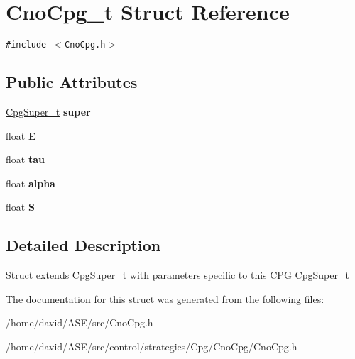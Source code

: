 \hypertarget{structCnoCpg__t}{
\section{CnoCpg\_\-t Struct Reference}
\label{structCnoCpg__t}
}
{\tt \#include $<$CnoCpg.h$>$}

\subsection*{Public Attributes}
\begin{CompactItemize}
\item 
\hypertarget{structCnoCpg__t_63a06575d9d87f4df750ba664cebd9e6}{
\hyperlink{structCpgSuper__t}{CpgSuper\_\-t} \textbf{super}}
\label{structCnoCpg__t_63a06575d9d87f4df750ba664cebd9e6}

\item 
\hypertarget{structCnoCpg__t_bf4e0776f09b677fb325a38092357fe0}{
float \textbf{E}}
\label{structCnoCpg__t_bf4e0776f09b677fb325a38092357fe0}

\item 
\hypertarget{structCnoCpg__t_097cafd33f3ef4612957cde820333731}{
float \textbf{tau}}
\label{structCnoCpg__t_097cafd33f3ef4612957cde820333731}

\item 
\hypertarget{structCnoCpg__t_c3e4ce0d31e2a7abf71f7092582110a8}{
float \textbf{alpha}}
\label{structCnoCpg__t_c3e4ce0d31e2a7abf71f7092582110a8}

\item 
\hypertarget{structCnoCpg__t_cbdeb5591b38c7fa2eed05039dcf4210}{
float \textbf{S}}
\label{structCnoCpg__t_cbdeb5591b38c7fa2eed05039dcf4210}

\end{CompactItemize}


\subsection{Detailed Description}
Struct extends \hyperlink{structCpgSuper__t}{CpgSuper\_\-t} with parameters specific to this CPG  \hyperlink{structCpgSuper__t}{CpgSuper\_\-t} 

The documentation for this struct was generated from the following files:\begin{CompactItemize}
\item 
/home/david/ASE/src/CnoCpg.h\item 
/home/david/ASE/src/control/strategies/Cpg/CnoCpg/CnoCpg.h\end{CompactItemize}
